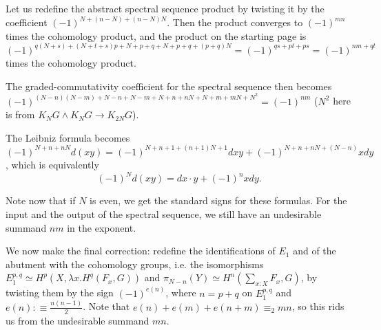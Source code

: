 \documentclass{amsart}
\theoremstyle{definition}
\newcommand{\tot}[2]{\sum\limits_{#1}^{}{#2}}
\begin{document}
Let us redefine the abstract spectral sequence product by twisting it by the coefficient $(-1)^{N+(n-N)+(n-N)N}$.
Then the product converges to
$(-1)^{mn}$
times the cohomology product, and the product on the starting page is
$(-1)^{q(N+s)+(N+t+s)p + N+p+q+N+p+q+(p+q)N} = (-1)^{qs+pt+ps} = (-1)^{nm+qt}$
times the cohomology product.

The graded-commutativity coefficient for the spectral sequence then becomes
\\
$(-1)^{(N-n)(N-m)+N-n+N-m+N+n+nN+N+m+mN+N^2} = (-1)^{nm}$ ($N^2$ here is from $K_NG \wedge K_NG \to K_{2N}G$).

The Leibniz formula becomes $(-1)^{N+n+nN}d(xy) = (-1)^{N+n+1+(n+1)N+1}dxy + (-1)^{N+n+nN+(N-n)}xdy$, which is equivalently
$$(-1)^N d(xy) = dx \cdot y + (-1)^{n}xdy.$$

Note now that if $N$ is even, we get the standard signs for these formulas. For the input and the output of the spectral sequence, we still have an undesirable summand $nm$ in the exponent.

We now make the final correction: redefine the identifications of $E_1$ and of the abutment with the cohomology groups, i.e. the isomorphisms $E_1^{p,q} \simeq H^p(X, \lambda x.H^q(F_x, G))$ and $\pi_{N-n}(Y) \simeq H^n(\tot{x:X}{F_x}, G)$, by twisting them by the sign $(-1)^{e(n)}$, where $n = p+q$ on $E_1^{p,q}$ and $e(n) :\equiv \frac{n(n-1)}{2}$. Note that $e(n) + e(m) + e(n+m) \equiv_2 mn$, so this rids us from the undesirable summand $mn$.
\end{document}
